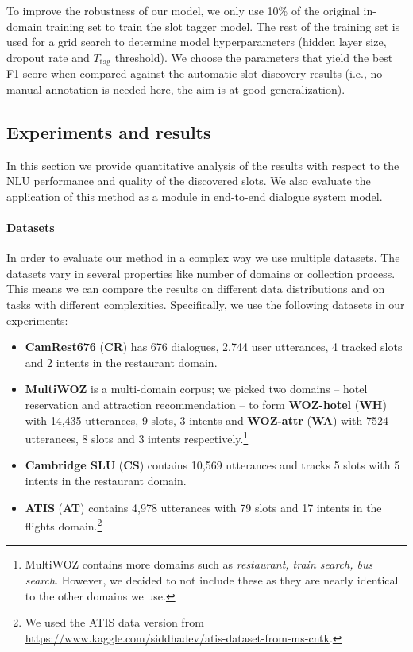 To improve the robustness of our model, 
we only use 10\% of the original in-domain training set to train the slot tagger model. The rest of the training set is used for a grid search to determine model hyperparameters (hidden layer size, dropout rate and $T_{\text{tag}}$ threshold). We choose the parameters that yield the best F1 score when compared against the automatic slot discovery results (i.e., no manual annotation is needed here, the aim is at good generalization).
\subsection{Experiments and results}
\label{03:discovery_results}
In this section we provide quantitative analysis of the results with respect to the NLU performance and quality of the discovered slots.
We also evaluate the application of this method as a module in end-to-end dialogue system model.
\paragraph{Datasets}
In order to evaluate our method in a complex way we use multiple datasets.
The datasets vary in several properties like number of domains or collection process.
This means we can compare the results on different data distributions and on tasks with different complexities.
Specifically, we use the following datasets in our experiments:
\begin{itemize}
    \item \textbf{CamRest676} (\textbf{CR}) \cite{wen2016network} has 676 dialogues, 2,744 user utterances, 4 tracked slots and 2 intents in the restaurant domain.
    \item \textbf{MultiWOZ} \cite{budzianowski2018multiwoz,eric2019multiwoz} is a multi-domain corpus; we picked two domains -- hotel reservation and attraction recommendation -- to form \textbf{WOZ-hotel} (\textbf{WH}) with 14,435 utterances, 9 slots, 3 intents and \textbf{WOZ-attr} (\textbf{WA}) with 7524 utterances, 8 slots and 3 intents respectively.\footnote{MultiWOZ contains more domains such as \emph{restaurant, train search, bus search}. However, we decided to not include these as they are nearly identical to the other domains we use.}
    \item \textbf{Cambridge SLU} \cite{henderson2012discriminative} (\textbf{CS}) contains 10,569 utterances and tracks 5 slots with 5 intents in the restaurant domain.
    \item \textbf{ATIS} (\textbf{AT}) \cite{hemphill_atis_1990} contains 4,978 utterances with 79 slots and 17 intents in the flights domain.\footnote{We used the ATIS data version from \url{https://www.kaggle.com/siddhadev/atis-dataset-from-ms-cntk}.}
\end{itemize}

